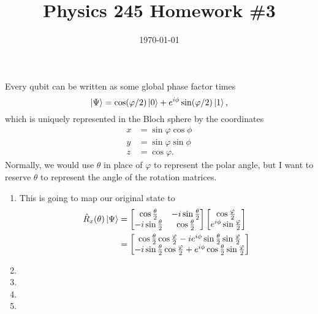 \documentclass{article}
\date{\today}
\title{Physics 245 Homework \#3}
\begin{document}
\maketitle

\begin{prob}
\end{prob}
Every qubit can be written as some global phase factor times
\[ \left\lvert \Psi \right\rangle = \cos(\varphi/2) \left\lvert 0 \right\rangle + e^{i \phi} \sin(\varphi/2) \left\lvert 1 \right\rangle, \]
which is uniquely represented in the Bloch sphere by the coordinates
\begin{align*}
    x &= \sin \varphi \cos \phi \\
    y &= \sin \varphi \sin \phi \\
    z &= \cos \varphi.
\end{align*}
Normally, we would use $\theta$ in place of $\varphi$ to represent the polar angle, but I want to reserve $\theta$ to represent the angle of the rotation matrices.

\begin{enumerate}[label=(\alph*)]
    \item This is going to map our original state to
        \begin{align*}
            \hat{R}_x(\theta) \left\lvert \Psi \right\rangle &= \begin{bmatrix}
                \cos \frac{\theta}{2} & -i \sin \frac{\theta}{2} \\
                -i \sin \frac{\theta}{2} & \cos \frac{\theta}{2}
            \end{bmatrix} \begin{bmatrix}
            \cos \frac{\varphi}{2} \\
            e^{i \phi} \sin \frac{\varphi}{2}
            \end{bmatrix} \\
                                         &= \begin{bmatrix}
                                             \cos \frac{\theta}{2} \cos \frac{\varphi}{2} - i e^{i \phi} \sin \frac{\theta}{2} \sin \frac{\varphi}{2} \\
                                             -i \sin \frac{\theta}{2} \cos \frac{\varphi}{2} + e^{i \phi} \cos \frac{\theta}{2} \sin \frac{\varphi}{2}
                                         \end{bmatrix}
        \end{align*}
        
    \item
    \item
    \item
    \item
\end{enumerate}
\end{document}
